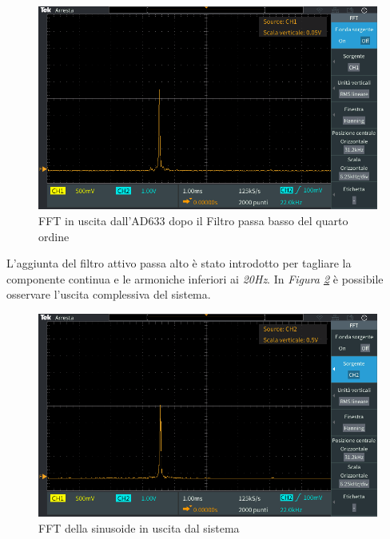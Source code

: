 \documentclass[titlepage]{report}
\begin{document}
	\begin{figure}[H]
		\centering
		\includegraphics[scale = 0.5]{Immagini/fft_ad633+lp4.PNG}
		\caption{FFT in uscita dall'AD633 dopo il Filtro passa basso del quarto ordine}
		\label{fig:FFTAD33+LP4}
	\end{figure}

	L'aggiunta del filtro attivo passa alto è stato introdotto per tagliare la componente continua e le armoniche inferiori ai \textit{20Hz}.
	In \textit{Figura \ref{fig:FFTfinale}} è possibile osservare l'uscita complessiva del sistema.

	\begin{figure}[H]
		\centering
		\includegraphics[scale = 0.5]{Immagini/ftt_ad633+lp4+hp1_final.PNG}
		\caption{FFT della sinusoide in uscita dal sistema}
		\label{fig:FFTfinale}
	\end{figure}
\end{document}
